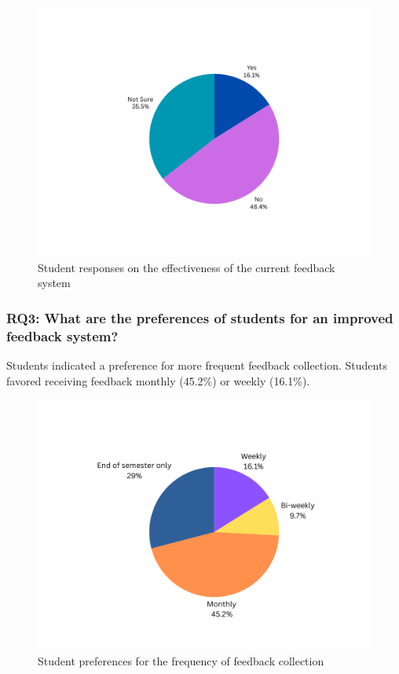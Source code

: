 \documentclass[conference]{IEEEtran}
\begin{document}
\begin{figure}[!htbp]
    \centering
    \includegraphics[width=0.8\linewidth]{feedback_action.png} 
    \caption{Student responses on the effectiveness of the current feedback system}
    \label{fig:feedback_action}
\end{figure}


\subsubsection{RQ3: What are the preferences of students for an improved feedback system?}
Students indicated a preference for more frequent feedback collection. Students favored receiving feedback monthly (45.2\%) or weekly (16.1\%).

\begin{figure}[!htbp]
    \centering
    \includegraphics[width=0.8\linewidth]{feedback_report.png} 
    \caption{Student preferences for the frequency of feedback collection}
    \label{fig:feedback_report}
\end{figure}
\end{document}
